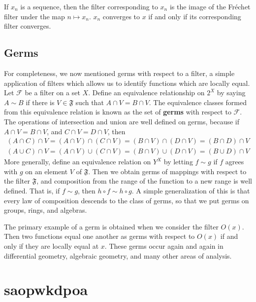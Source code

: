 \begin{example}
    If $x_n$ is a sequence, then the filter corresponding to $x_n$ is the image of the Fr\'{e}chet filter under the map $n \mapsto x_n$. $x_n$ converges to $x$ if and only if its corresponding filter converges.
\end{example}

\subsection{Germs}

For completeness, we now mentioned germs with respect to a filter, a simple application of filters which allows us to identify functions which are locally equal. Let $\mathcal{F}$ be a filter on a set $X$. Define an equivalence relationship on $2^X$ by saying $A \sim B$ if there is $V \in \mathfrak{F}$ such that $A \cap V = B \cap V$. The equivalence classes formed from this equivalence relation is known as the set of {\bf germs} with respect to $\mathcal{F}$. The operations of intersection and union are well defined on germs, because if $A \cap V = B \cap V$, and $C \cap V = D \cap V$, then
%
\begin{align*}
    (A \cap C) \cap V = (A \cap V) \cap (C \cap V) = (B \cap V) \cap (D \cap V) = (B \cap D) \cap V\\
    (A \cup C) \cap V = (A \cap V) \cup (C \cap V) = (B \cap V) \cup (D \cap V) = (B \cup D) \cap V
\end{align*}
%
More generally, define an equivalence relation on $Y^X$ by letting $f \sim g$ if $f$ agrees with $g$ on an element $V$ of $\mathfrak{F}$. Then we obtain germs of mappings with respect to the filter $\mathfrak{F}$, and composition from the range of the function to a new range is well defined. That is, if $f \sim g$, then $h \circ f \sim h \circ g$. A simple generalization of this is that every law of composition descends to the class of germs, so that we put germs on groups, rings, and algebras.

\begin{example}
    The primary example of a germ is obtained when we consider the filter $O(x)$. Then two functions equal one another as germs with respect to $O(x)$ if and only if they are locally equal at $x$. These germs occur again and again in differential geometry, algebraic geometry, and many other areas of analysis.
\end{example}

\section{saopwkdpoa}


